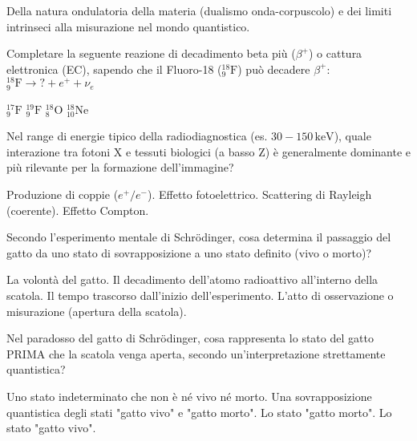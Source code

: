 \documentclass{exam}%
\begin{document}
\begin{questions}
\begin{choices}
\choice Della natura ondulatoria della materia (dualismo onda-corpuscolo) e dei limiti intrinseci alla misurazione nel mondo quantistico.%
\end{choices}%
\question Completare la seguente reazione di decadimento beta più ($\beta^+$) o cattura elettronica (EC), sapendo che il Fluoro-18 ($^{18}_{9}\text{F}$) può decadere $\beta^+$: $^{18}_{9}\text{F} \rightarrow ? + e^+ + \nu_e$%
\vspace{0.2em}%
\begin{multicols}{4}%
\begin{choices}%
\choice $^{17}_{9}\text{F}$%
\choice $^{19}_{9}\text{F}$%
\choice $^{18}_{8}\text{O}$%
\choice $^{18}_{10}\text{Ne}$%
\end{choices}%
\end{multicols}%
\question Nel range di energie tipico della radiodiagnostica (es. $30-150 \, \text{keV}$), quale interazione tra fotoni X e tessuti biologici (a basso Z) è generalmente dominante e più rilevante per la formazione dell'immagine?%
\vspace{0.2em}%
\begin{multicols}{2}%
\begin{choices}%
\choice Produzione di coppie ($e^+/e^-$).%
\choice Effetto fotoelettrico.%
\choice Scattering di Rayleigh (coerente).%
\choice Effetto Compton.%
\end{choices}%
\end{multicols}%
\question Secondo l'esperimento mentale di Schrödinger, cosa determina il passaggio del gatto da uno stato di sovrapposizione a uno stato definito (vivo o morto)?%
\vspace{0.2em}%
\begin{choices}%
\choice La volontà del gatto.%
\choice Il decadimento dell'atomo radioattivo all'interno della scatola.%
\choice Il tempo trascorso dall'inizio dell'esperimento.%
\choice L'atto di osservazione o misurazione (apertura della scatola).%
\end{choices}%
\question Nel paradosso del gatto di Schrödinger, cosa rappresenta lo stato del gatto PRIMA che la scatola venga aperta, secondo un'interpretazione strettamente quantistica?%
\vspace{0.2em}%
\begin{choices}%
\choice Uno stato indeterminato che non è né vivo né morto.%
\choice Una sovrapposizione quantistica degli stati "gatto vivo" e "gatto morto".%
\choice Lo stato "gatto morto".%
\choice Lo stato "gatto vivo".%
\end{choices}%

\end{questions}
\end{document}
